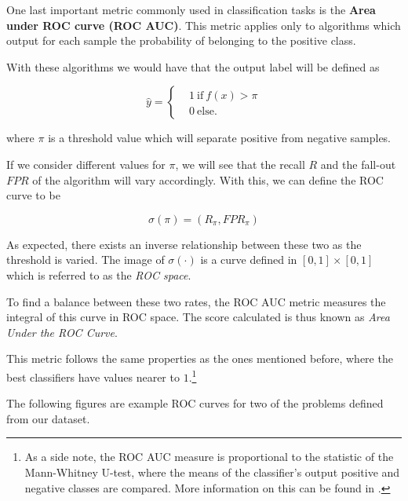 One last important metric commonly used in classification tasks is the \textbf{Area under ROC curve (ROC AUC)}.
This metric applies only to algorithms which output for each sample the probability of belonging to the positive class.

With these algorithms we would have that the output label will be defined as

\begin{equation}
\hat{y} =
\begin{cases}
&1 \ \mbox{if} \ f(x) > \pi \\
&0 \ \mbox{else}.
\end{cases}
\end{equation}

where $\pi$ is a threshold value which will separate positive from negative samples.


If we consider different values for $\pi$, we will see that the recall $R$ and the fall-out $FPR$ of the algorithm will vary accordingly.
With this, we can define the ROC curve to be

\begin{equation}
\sigma(\pi) = (R_\pi, FPR_\pi)
\end{equation}

As expected, there exists an inverse relationship between these two as the threshold is varied.
The image of $\sigma(\cdot)$ is a curve defined in $[0,1]\times[0,1]$ which is referred to as the \textit{ROC space}.

To find a balance between these two rates, the ROC AUC metric measures the integral of this curve in ROC space.
The score calculated is thus known as \textit{Area Under the ROC Curve}.

This metric follows the same properties as the ones mentioned before, where the best classifiers have values nearer to $1$.\footnote{As a side note, the ROC AUC measure is proportional to the statistic of the Mann-Whitney U-test, where the means of the classifier's output positive and negative classes are compared.
More information on this can be found in \textcite{mason-rocAucRelationship}.}

The following figures are example ROC curves for two of the problems defined from our dataset.

